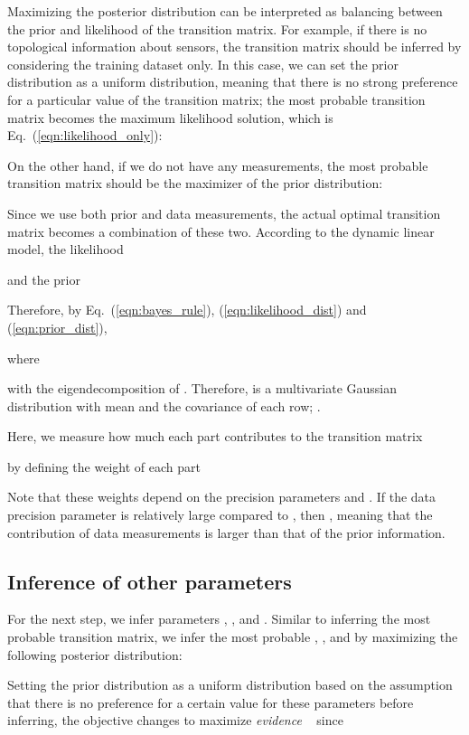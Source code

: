 \documentclass[journal]{IEEEtran}
\begin{document}
Maximizing the posterior distribution can be interpreted as balancing between the prior and likelihood of the transition matrix.
For example, if there is no topological information about sensors, the transition matrix should be inferred by considering the training dataset only. 
In this case, we can set the prior distribution as a uniform distribution, meaning that there is no strong preference for a particular value of the transition matrix; the most probable transition matrix becomes the maximum likelihood solution, which is Eq.~(\ref{eqn:likelihood_only}):

On the other hand, if we do not have any measurements, the most probable transition matrix should be the maximizer of the prior distribution:


Since we use both prior and data measurements, the actual optimal transition matrix becomes a combination of these two.
According to the dynamic linear model, the likelihood

and the prior

Therefore, by Eq.~(\ref{eqn:bayes_rule}), (\ref{eqn:likelihood_dist}) and (\ref{eqn:prior_dist}),

where 

with the eigendecomposition of . 
Therefore,  is a multivariate Gaussian distribution with mean  and the covariance of each row; .


Here, we measure how much each part contributes to the transition matrix

by defining the weight of each part

Note that these weights depend on the precision parameters  and .
If the data precision parameter  is relatively large compared to ,
then , meaning that the contribution of data measurements is larger than that of the prior information.


\subsection{Inference of other parameters}


For the next step, we infer parameters , , and .
Similar to inferring the most probable transition matrix, we infer the most probable , , and  by maximizing the following posterior distribution:

Setting the prior distribution  as a uniform distribution based on the assumption that there is no preference for a certain value for these parameters before inferring, the objective changes to maximize {\it{evidence}} ~\cite{mackay1992bayesian} since
\end{document}
